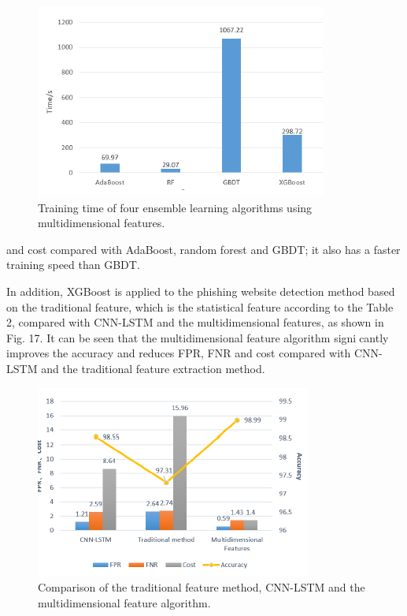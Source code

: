 \documentclass{ieeeaccess}
\begin{document}
\begin{figure}
    \centering
    \includegraphics[width=\linewidth]{figure16.png}
    \caption{Training time of four ensemble learning algorithms using
multidimensional features.}
    \label{fig:16}
\end{figure}
and cost compared with AdaBoost, random forest and GBDT;
it also has a faster training speed than GBDT.
\par In addition, XGBoost is applied to the phishing website
detection method based on the traditional feature, which is
the statistical feature according to the Table 2, compared with
CNN-LSTM and the multidimensional features, as shown
in Fig. 17. It can be seen that the multidimensional feature
algorithm signicantly improves the accuracy and reduces
FPR, FNR and cost compared with CNN-LSTM and the
traditional feature extraction method.
\begin{figure}
    \centering
    \includegraphics[width=\linewidth]{figure17.png}
    \caption{Comparison of the traditional feature method, CNN-LSTM and
the multidimensional feature algorithm.}
    \label{fig:17}
\end{figure}
\end{document}
